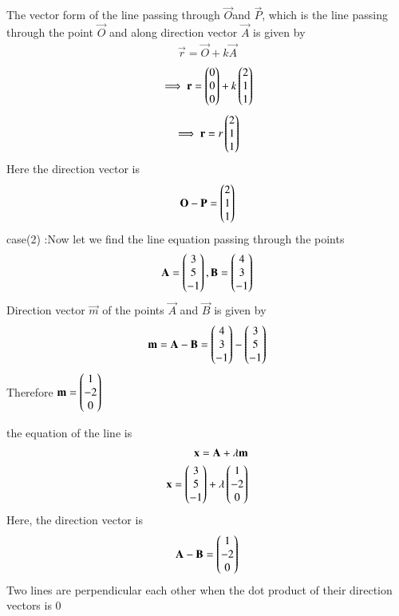 \documentclass[journal,12pt,twocolumn]{IEEEtran}
\begin{document}
The vector form of the line passing through $\vec{O} $and $\vec{P}$, which is the line passing through the point $\vec{O}$ and along direction vector $\vec{A}$ is given by 
\begin{align}
\vec{r}=\vec{O}+k\vec{A}
\end{align}
\begin{align}
\implies \mathbf{r}=\begin{pmatrix}0\\0\\0\end{pmatrix}+k\begin{pmatrix}2\\1\\1\end{pmatrix}
\end{align}
\begin{align}
\implies \mathbf{r}=r\begin{pmatrix}2\\1\\1\end{pmatrix}
\end{align}
Here the direction vector is 
\begin{align}
\mathbf{O}-\mathbf{P}=\begin{pmatrix}2\\1\\1\end{pmatrix}
\end{align}
case(2) :Now let we find the line equation passing through the points
\begin{align}
\mathbf{A}=\begin{pmatrix}3\\5\\-1\end{pmatrix} , \mathbf{B}=\begin{pmatrix}4\\3\\-1\end{pmatrix}
\end{align}
Direction vector $\vec{m}$ of the points $\vec{A}$ and $\vec{B}$ is given by 
\begin{align}
\mathbf{m}=\mathbf{A}-\mathbf{B}
=\begin{pmatrix}4\\3\\-1\end{pmatrix}-\begin{pmatrix}3\\5\\-1\end{pmatrix}
\end{align}
Therefore $\mathbf{m}=\begin{pmatrix}1\\-2\\0\end{pmatrix}$

the equation of the line is 
\begin{align}
\mathbf{x}=\mathbf{A}+\lambda\mathbf{m}
\\
\mathbf{x}=\begin{pmatrix}3\\5\\-1\end{pmatrix}+\lambda\begin{pmatrix}1\\-2\\0\end{pmatrix}
\end{align}
Here, the direction vector is 
\begin{align}
\mathbf{A}-\mathbf{B}=\begin{pmatrix}1\\-2\\0\end{pmatrix}
\end{align}
Two lines are perpendicular each other when the dot product of their direction vectors is 0
\end{document}
